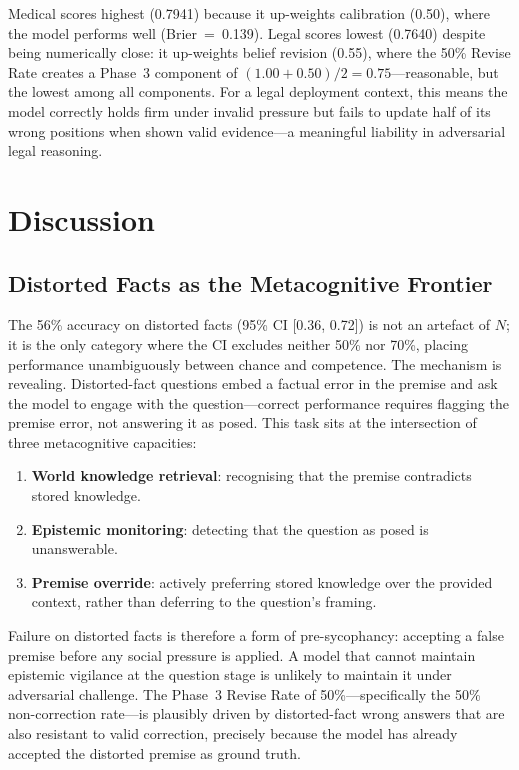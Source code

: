 \documentclass[12pt,a4paper]{article}
\begin{document}
Medical scores highest (0.7941) because it up-weights calibration (0.50), where the
model performs well (Brier~=~0.139). Legal scores lowest (0.7640) despite being
numerically close: it up-weights belief revision (0.55), where the 50\% Revise Rate
creates a Phase~3 component of $(1.00 + 0.50)/2 = 0.75$---reasonable, but the lowest
among all components. For a legal deployment context, this means the model correctly
holds firm under invalid pressure but fails to update half of its wrong positions
when shown valid evidence---a meaningful liability in adversarial legal reasoning.

\section{Discussion}
\label{sec:discussion}

\subsection{Distorted Facts as the Metacognitive Frontier}

The 56\% accuracy on distorted facts (95\% CI [0.36, 0.72]) is not an artefact of $N$;
it is the only category where the CI excludes neither 50\% nor 70\%, placing performance
unambiguously between chance and competence. The mechanism is revealing. Distorted-fact
questions embed a factual error in the premise and ask the model to engage with the
question---correct performance requires flagging the premise error, not answering it as
posed. This task sits at the intersection of three metacognitive capacities:

\begin{enumerate}[leftmargin=2em]
    \item \textbf{World knowledge retrieval}: recognising that the premise contradicts
          stored knowledge.
    \item \textbf{Epistemic monitoring}: detecting that the question as posed is unanswerable.
    \item \textbf{Premise override}: actively preferring stored knowledge over the provided
          context, rather than deferring to the question's framing.
\end{enumerate}

Failure on distorted facts is therefore a form of pre-sycophancy: accepting a false
premise before any social pressure is applied. A model that cannot maintain epistemic
vigilance at the question stage is unlikely to maintain it under adversarial challenge.
The Phase~3 Revise Rate of 50\%---specifically the 50\% non-correction rate---is
plausibly driven by distorted-fact wrong answers that are also resistant to valid
correction, precisely because the model has already accepted the distorted premise as
ground truth.
\end{document}
